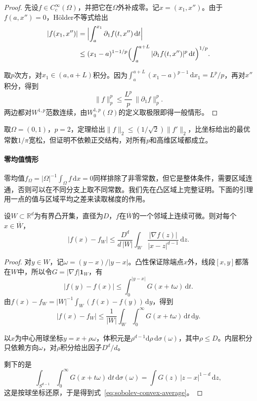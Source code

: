 \begin{proof}
先设$f\in C_c^\infty(\Omega)$，并把它在$\Omega$外补成零。记$x=(x_1,x'')$。由于$f(a,x'')=0$，Hölder不等式给出
\[
\begin{aligned}
|f(x_1,x'')|&=\Bigl|\int_a^{x_1}\partial_1f(t,x'')\,\mathrm dt\Bigr|\\
&\leq(x_1-a)^{1-1/p}\Bigl(\int_a^{a+L}|\partial_1f(t,x'')|^p\,\mathrm dt\Bigr)^{1/p}.
\end{aligned}
\]

取$p$次方，对$x_1\in(a,a+L)$积分。因为$\int_a^{a+L}(x_1-a)^{p-1}\,\mathrm dx_1=L^p/p$，再对$x''$积分，得到
\[
\lVert f\rVert_p^p\leq\frac{L^p}p\,\lVert\partial_1f\rVert_p^p .
\]
两边都对$W^{1,p}$范数连续，由$W_0^{1,p}(\Omega)$的定义取极限即得一般情形。
\end{proof}

取$\Omega=(0,1)$，$p=2$，定理给出$\lVert f\rVert_2\leq(1/\sqrt2)\lVert f'\rVert_2$，比坐标给出的最优常数$1/\pi$宽松，但证明不依赖正交结构，对所有$p$和高维区域都成立。

\paragraph{零均值情形}
零均值$f_\Omega=|\Omega|^{-1}\int_\Omega f\,\mathrm dx=0$同样排除了非零常数，但它是整体条件，需要区域连通，否则可以在不同分支上取不同常数。我们先在凸区域上完整证明。下面的引理用一点的值与区域平均之差来读取梯度的作用。

\begin{lemma}[凸区域上的平均估计]
\label{lem:sobolev-convex-average}
设$W\subset\mathbb R^d$为有界凸开集，直径为$D$，$f$在$\overline W$的一个邻域上连续可微。则对每个$x\in\overline W$，
\begin{equation}
|f(x)-f_W|\leq\frac{D^d}{d\,|W|}\int_W\frac{|\nabla f(z)|}{|x-z|^{d-1}}\,\mathrm dz .
\label{eq:sobolev-convex-average}
\end{equation}
\end{lemma}

\begin{proof}
对$y\in W$，记$\omega=(y-x)/|y-x|$。凸性保证除端点$x$外，线段$[x,y]$都落在$W$中，所以令$G=|\nabla f|\mathbf 1_W$，有
\[
|f(y)-f(x)|\leq\int_0^{|y-x|}G(x+t\omega)\,\mathrm dt .
\]
由$f(x)-f_W=|W|^{-1}\int_W(f(x)-f(y))\,\mathrm dy$，得到
\[
|f(x)-f_W|\leq\frac1{|W|}\int_W\int_0^\infty G(x+t\omega)\,\mathrm dt\,\mathrm dy .
\]

以$x$为中心用球坐标$y=x+\rho\omega$，体积元是$\rho^{d-1}\mathrm d\rho\,\mathrm d\sigma(\omega)$，其中$\rho\leq D$。内层积分只依赖方向$\omega$，对$\rho$积分给出因子$D^d/d$。

剩下的是
\[
\int_{S^{d-1}}\int_0^\infty G(x+t\omega)\,\mathrm dt\,\mathrm d\sigma(\omega)
=\int G(z)\,|z-x|^{1-d}\,\mathrm dz,
\]
这是按球坐标还原，于是得到式~\eqref{eq:sobolev-convex-average}。
\end{proof}

